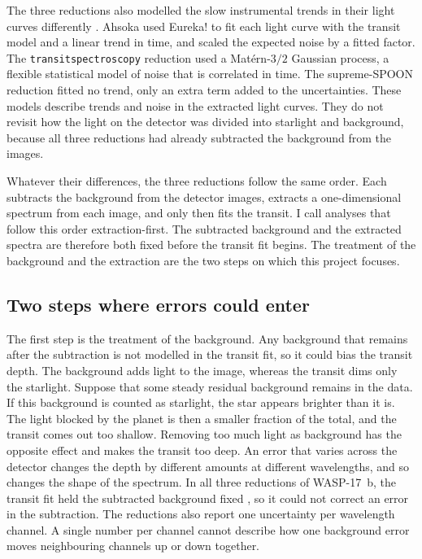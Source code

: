The three reductions also modelled the slow instrumental trends in their light
curves differently \citep{LouieEtAl2025}. Ahsoka used Eureka! \citep{BellEtAl2022} to fit each light curve with the transit model and a linear trend in time, and scaled the expected noise by a fitted factor. The \texttt{transitspectroscopy} reduction used a
Mat\'ern-$3/2$ Gaussian process, a flexible statistical model of noise that is
correlated in time. The supreme-SPOON reduction fitted no trend, only an extra
term added to the uncertainties. These models describe trends and noise in
the extracted light curves. They do not revisit how the light on the detector
was divided into starlight and background, because all three reductions had
already subtracted the background from the images.

Whatever their differences, the three reductions follow the same order. Each
subtracts the background from the detector images, extracts a one-dimensional
spectrum from each image, and only then fits the transit. I call analyses that
follow this order extraction-first. The subtracted background and the extracted spectra are therefore both fixed before the transit fit begins. The treatment of the background and the extraction are the two steps on which this project focuses.

\subsection{Two steps where errors could enter}
\label{sec:structural-limitations}

The first step is the treatment of the background. Any background that remains after the subtraction is not modelled in the transit fit, so it could bias the transit depth. The background adds light to the image, whereas the
transit dims only the starlight. Suppose that some steady residual background
remains in the data. If this background is
counted as starlight, the star appears brighter than it is. The light blocked
by the planet is then a smaller fraction of the total, and the transit comes
out too shallow. Removing too much light as background has the opposite
effect and makes the transit too deep. An error that varies across the
detector changes the depth by different amounts at different wavelengths, and
so changes the shape of the spectrum. In all three reductions of WASP-17~b, the transit fit held the subtracted background fixed \citep{LouieEtAl2025}, so it could not correct an error in the subtraction. The
reductions also report one uncertainty per wavelength channel. A single
number per channel cannot describe how one background error moves
neighbouring channels up or down together.

